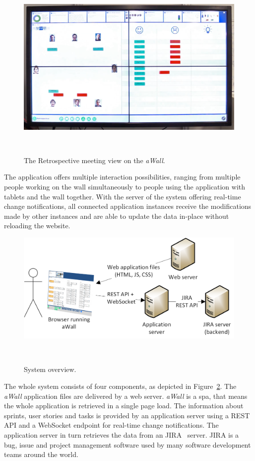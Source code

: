 \documentclass{sigchi}
\begin{document}
\begin{figure}
	\centering
	\includegraphics[width=\columnwidth]{figures/retrospective}
	\caption{The Retrospective meeting view on the \textit{aWall}.}
	~\label{fig:retrospective}
\end{figure}

The application offers multiple interaction possibilities, ranging from multiple people working on the wall simultaneously to people using the application with tablets and the wall together.
With the server of the system offering real-time change notifications, all connected application instances receive the modifications made by other instances and are able to update the data in-place without reloading the website.

\begin{figure}
	\centering
	\includegraphics[width=\columnwidth]{figures/systemoverview}
	\caption{System overview.}
	~\label{fig:systemoverview}
\end{figure}

The whole system consists of four components, as depicted in Figure~\ref{fig:systemoverview}.
The \textit{aWall} application files are delivered by a web server.
\textit{aWall} is a \gls{spa}, that means the whole application is retrieved in a single page load.
The information about sprints, user stories and tasks is provided by an application server using a REST API and a WebSocket endpoint for real-time change notifications.
The application server in turn retrieves the data from an JIRA~\cite{jira} server. JIRA is a bug, issue and project management software used by many software development teams around the world.
\end{document}

